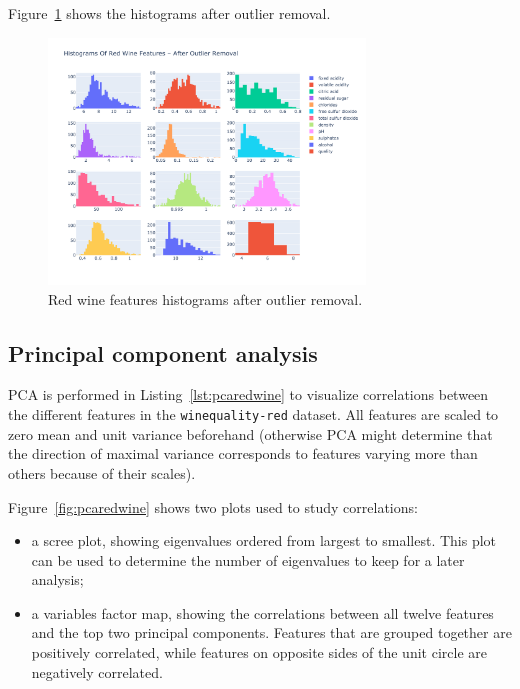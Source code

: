 \documentclass[12pt]{article}
\begin{document}
  Figure~\ref{fig:redwinehisto2} shows the histograms after outlier removal.
  \begin{figure}[!ht]
    \centering
    \includegraphics[width=0.75\textwidth]{figures/redwinehisto2}
    \caption{Red wine features histograms after outlier removal.}%
    \label{fig:redwinehisto2}
  \end{figure} 

  \subsection{Principal component analysis}

  PCA is performed in Listing~\ref{lst:pcaredwine} to visualize correlations
  between the different features in the \lstinline{winequality-red} dataset.
  All features are scaled to zero mean and unit variance beforehand (otherwise
  PCA might determine that the direction of maximal variance corresponds to
  features varying more than others because of their scales).

  Figure~\ref{fig:pcaredwine} shows two plots used to study correlations:
  \begin{itemize}
    \item a scree plot, showing eigenvalues ordered from largest to smallest.
      This plot can be used to determine the number of eigenvalues to keep for
      a later analysis;
    \item a variables factor map, showing the correlations between all twelve
      features and the top two principal components. Features that are grouped
      together are positively correlated, while features on opposite sides of
      the unit circle are negatively correlated.
  \end{itemize}
\end{document}
